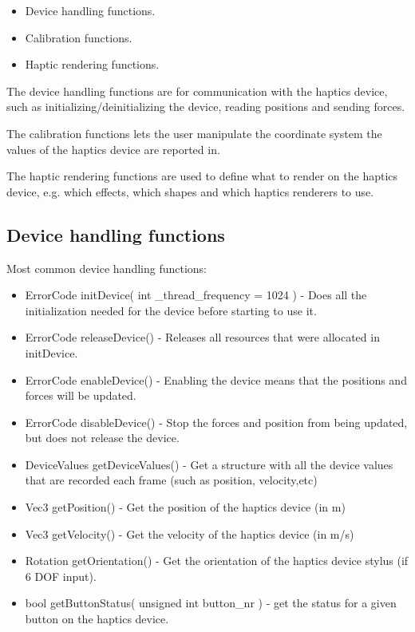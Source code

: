 \begin{itemize}
\item Device handling functions.
\item Calibration functions.
\item Haptic rendering functions.
\end{itemize}

The device handling functions are for communication with the haptics device, such as initializing/deinitializing the device, reading positions and sending forces. 

The calibration functions lets the user manipulate the coordinate system the values of the haptics device are reported in.

The haptic rendering functions are used to define what to render on the haptics device, e.g. which effects, which shapes and which haptics renderers to use.

\subsection{Device handling functions}

Most common device handling functions:

\begin{itemize}
\item {\ttfamily ErrorCode initDevice( int \_thread\_frequency = 1024 )} -  Does all the initialization needed for the
device before starting to use it.
\item {\ttfamily ErrorCode releaseDevice()} - Releases all resources that were allocated
in initDevice.
\item {\ttfamily ErrorCode enableDevice()} - Enabling the device means that the
positions and forces will be updated.
\item {\ttfamily ErrorCode disableDevice()} - Stop the forces and position
from being updated, but does not release the device.
\item {\ttfamily DeviceValues getDeviceValues()} - Get a structure with all the
  device values that are recorded each frame (such as position,
  velocity,etc)
\item {\ttfamily Vec3 getPosition()} - Get the position of the haptics device (in
  m)
\item {\ttfamily Vec3 getVelocity()} - Get the velocity of the haptics device (in
  m/s)
\item {\ttfamily Rotation getOrientation()} - Get the orientation of the haptics
  device stylus (if 6 DOF input).
\item {\ttfamily bool getButtonStatus( unsigned int button\_nr )} - get the status
  for a given button on the haptics device.
\end{itemize}


